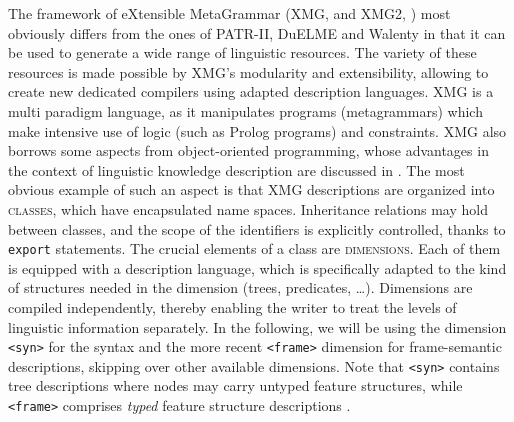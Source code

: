 \documentclass[output=paper]{langsci/langscibook}
\begin{document}
The framework of eXtensible MetaGrammar (XMG, \citealt{crabbe:etal:13} and XMG2, \citealt{petitjean2016}) most obviously differs from the ones of PATR-II, DuELME and Walenty in that it can be used to generate a wide range of linguistic resources. The variety of these resources is made possible by XMG's modularity and extensibility, allowing to create new dedicated compilers using adapted description languages. XMG is a multi paradigm language, as it manipulates programs (metagrammars) which make intensive use of logic (such as Prolog programs) and constraints. XMG also borrows some aspects from object-oriented programming, whose advantages in the context of linguistic knowledge description are discussed in \cite{daelemans:desmedt:94}. The most obvious example of such an aspect is that XMG descriptions are organized into \textsc{classes}, which have encapsulated name spaces. Inheritance relations may hold between classes, and the scope of the identifiers is explicitly controlled, thanks to \texttt{export} statements. The crucial elements of a class are \textsc{dimensions}. Each of them is equipped with a description language, which is specifically adapted to the kind of structures needed in the dimension (trees, predicates, \ldots). Dimensions are compiled independently, thereby enabling the  writer to treat the levels of linguistic information separately. In the following, we will be using the dimension \texttt{<syn>} for the syntax and the more recent \texttt{<frame>} dimension for frame-semantic descriptions, skipping over other available dimensions. Note that \texttt{<syn>} contains tree descriptions where nodes may carry untyped feature structures, while \texttt{<frame>} comprises \textit{typed} feature structure descriptions \citep{lichte:petitjean:15}.
\end{document}
